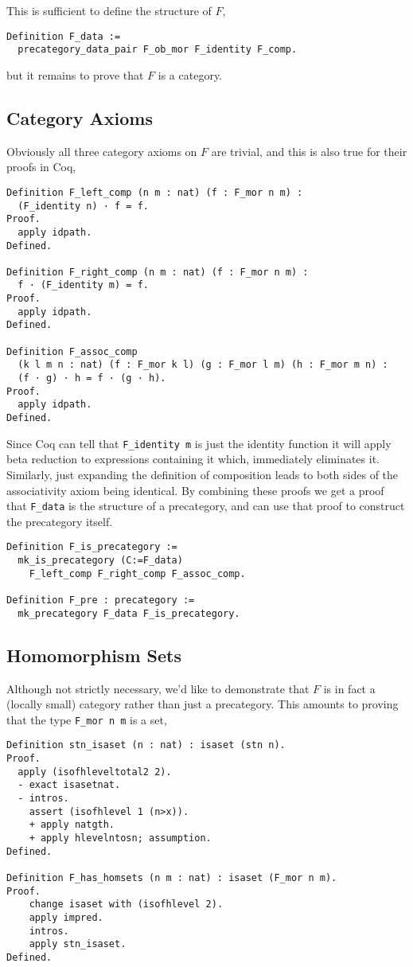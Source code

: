 This is sufficient to define the structure of $F$,
%
\begin{lstlisting}
Definition F_data := 
  precategory_data_pair F_ob_mor F_identity F_comp.
\end{lstlisting}
%
but it remains to prove that $F$ is a category.

\subsection{Category Axioms}
Obviously all three category axioms on $F$ are trivial, and this is also true
for their proofs in Coq,
\begin{lstlisting}
Definition F_left_comp (n m : nat) (f : F_mor n m) : 
  (F_identity n) · f = f.
Proof.
  apply idpath.
Defined.

Definition F_right_comp (n m : nat) (f : F_mor n m) : 
  f · (F_identity m) = f.
Proof.
  apply idpath.
Defined.

Definition F_assoc_comp 
  (k l m n : nat) (f : F_mor k l) (g : F_mor l m) (h : F_mor m n) :
  (f · g) · h = f · (g · h).
Proof.
  apply idpath.
Defined.
\end{lstlisting}

Since Coq can tell that \verb|F_identity m| is just the identity function it
will apply beta reduction to expressions containing it which, immediately
eliminates it. Similarly, just expanding the definition of composition leads to
both sides of the associativity axiom being identical. By combining these proofs
we get a proof that \verb|F_data| is the structure of a precategory, and can
use that proof to construct the precategory itself.

\begin{lstlisting}
Definition F_is_precategory := 
  mk_is_precategory (C:=F_data) 
    F_left_comp F_right_comp F_assoc_comp.

Definition F_pre : precategory := 
  mk_precategory F_data F_is_precategory.
\end{lstlisting}

\subsection{Homomorphism Sets}
Although not strictly necessary, we'd like to demonstrate that $F$ is in fact a
(locally small) category rather than just a precategory. This amounts to proving
that the type \verb|F_mor n m| is a set,

\begin{lstlisting}
Definition stn_isaset (n : nat) : isaset (stn n).
Proof.
  apply (isofhleveltotal2 2).
  - exact isasetnat.
  - intros.
    assert (isofhlevel 1 (n>x)).
    + apply natgth.
    + apply hlevelntosn; assumption.
Defined.

Definition F_has_homsets (n m : nat) : isaset (F_mor n m).
Proof.
    change isaset with (isofhlevel 2).
    apply impred.
    intros.
    apply stn_isaset.
Defined.
\end{lstlisting}

